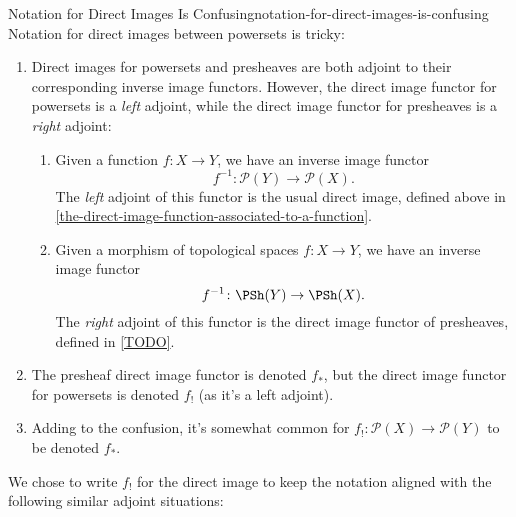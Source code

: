 \begin{warning}{Notation for Direct Images Is Confusing}{notation-for-direct-images-is-confusing}%
    Notation for direct images between powersets is tricky:
    \begin{enumerate}
        \item\label{notation-for-direct-images-is-confusing-1}Direct images for powersets and presheaves are both adjoint to their corresponding inverse image functors. However, the direct image functor for powersets is a \emph{left} adjoint, while the direct image functor for presheaves is a \emph{right} adjoint:
            \begin{enumerate}
                \item\label{notation-for-direct-images-is-confusing-1a}Given a function $f\colon X\to Y$, we have an inverse image functor
                    \[
                        f^{-1}%
                        \colon%
                        \mathcal{P}(Y)%
                        \to%
                        \mathcal{P}(X).%
                    \]%
                    The \emph{left} adjoint of this functor is the usual direct image, defined above in \cref{the-direct-image-function-associated-to-a-function}.
                \item\label{notation-for-direct-images-is-confusing-1b}Given a morphism of topological spaces $f\colon X\to Y$, we have an inverse image functor
                    \[
                        f^{-1}%
                        \colon%
                        \PSh(Y)%
                        \to%
                        \PSh(X).%
                    \]%
                    The \emph{right} adjoint of this functor is the direct image functor of presheaves, defined in \cref{TODO}.
            \end{enumerate}
        \item\label{notation-for-direct-images-is-confusing-2}The presheaf direct image functor is denoted $f_{*}$, but the direct image functor for powersets is denoted $f_{!}$ (as it's a left adjoint).
        \item\label{notation-for-direct-images-is-confusing-3}Adding to the confusion, it's somewhat common for $f_{!}\colon\mathcal{P}(X)\to\mathcal{P}(Y)$ to be denoted $f_{*}$.
    \end{enumerate}
    We chose to write $f_{!}$ for the direct image to keep the notation aligned with the following similar adjoint situations:
    \begingroup%
    \setlength\cellspacetoplimit{3pt}

\end{warning}
